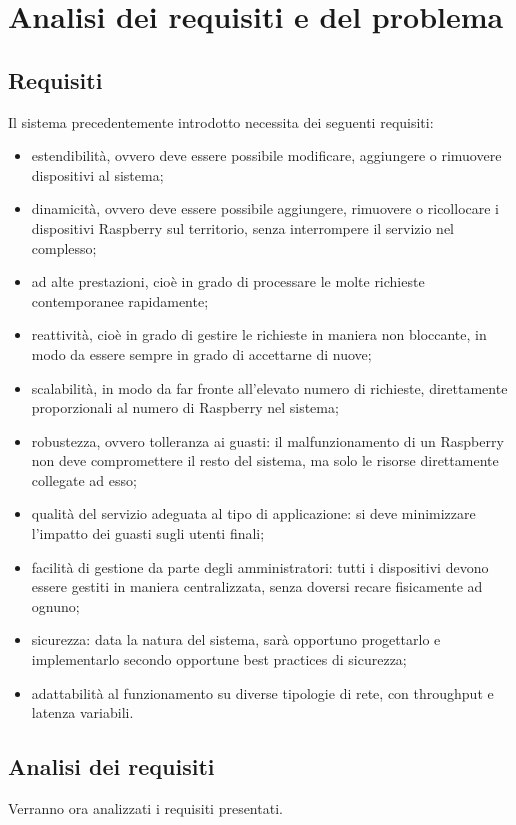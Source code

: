 \chapter{Analisi dei requisiti e del problema}

\section{Requisiti}

Il sistema precedentemente introdotto necessita dei seguenti requisiti:
\begin{itemize}
 \item estendibilità, ovvero deve essere possibile modificare, aggiungere o rimuovere dispositivi al sistema;
 \item dinamicità, ovvero deve essere possibile aggiungere, rimuovere o ricollocare i dispositivi Raspberry sul territorio, senza interrompere il servizio nel complesso;
 \item ad alte prestazioni, cioè in grado di processare le molte richieste contemporanee rapidamente;
 \item reattività, cioè in grado di gestire le richieste in maniera non bloccante, in modo da essere sempre in grado di accettarne di nuove;
 \item scalabilità, in modo da far fronte all’elevato numero di richieste, direttamente proporzionali al numero di Raspberry nel sistema;
 \item robustezza, ovvero tolleranza ai guasti: il malfunzionamento di un Raspberry non deve compromettere il resto del sistema, ma solo le risorse direttamente collegate ad esso;
 \item qualità del servizio adeguata al tipo di applicazione: si deve minimizzare l'impatto dei guasti sugli utenti finali;
 \item facilità di gestione da parte degli amministratori: tutti i dispositivi devono essere gestiti in maniera centralizzata, senza doversi recare fisicamente ad ognuno;
 \item sicurezza: data la natura del sistema, sarà opportuno progettarlo e implementarlo secondo opportune best practices di sicurezza;
 \item adattabilità al funzionamento su diverse tipologie di rete, con throughput e latenza variabili.
\end{itemize}

\section{Analisi dei requisiti}
Verranno ora analizzati i requisiti presentati.
